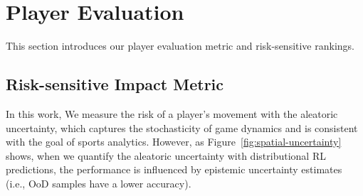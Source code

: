 \documentclass[letterpaper]{article} %
\begin{document}
\section{Player Evaluation}\label{Sec:player-evaluation}
This section introduces our player evaluation metric and risk-sensitive rankings.
\subsection{Risk-sensitive Impact Metric}\label{subsec:evaluation-metric}
In this work, We measure the risk of a player's movement with the aleatoric uncertainty, which captures the stochasticity of game dynamics and is consistent with the goal of sports analytics.
However, as Figure~\ref{fig:spatial-uncertainty} shows, when we quantify the aleatoric uncertainty with distributional RL predictions, the performance is influenced by epistemic uncertainty estimates (i.e., OoD samples have a lower accuracy). 
\end{document}
